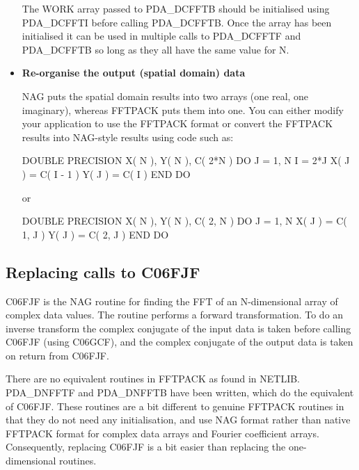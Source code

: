 \documentclass[11pt,twoside,nolof]{starlink}
\begin{document}
\begin{itemize}
   The WORK array passed to PDA\_DCFFTB should be initialised using
   PDA\_DCFFTI before calling PDA\_DCFFTB. Once the array has been
   initialised it can be used in multiple calls to PDA\_DCFFTF and
   PDA\_DCFFTB so long as they all have the same value for N.

\item\textbf{Re-organise the output (spatial domain) data}

   NAG puts the spatial domain results into two arrays (one real, one
   imaginary), whereas FFTPACK puts them into one. You can either
   modify your application to use the FFTPACK format or convert the
   FFTPACK results into NAG-style results using code such as:

\begin{terminalv}
      DOUBLE PRECISION X( N ), Y( N ), C( 2*N )
      DO J = 1, N
         I = 2*J
         X( J ) = C( I - 1 )
         Y( J ) = C( I )
      END DO
\end{terminalv}

   or

\begin{terminalv}
      DOUBLE PRECISION X( N ), Y( N ), C( 2, N )
      DO J = 1, N
         X( J ) = C( 1, J )
         Y( J ) = C( 2, J )
      END DO
\end{terminalv}

\end{itemize}


\subsection{\label{m_c06fjf}Replacing calls to C06FJF}

   C06FJF is the NAG routine for finding the FFT of an N-dimensional
   array of complex data values. The routine performs a forward
   transformation. To do an inverse transform the complex conjugate of
   the input data is taken before calling C06FJF (using C06GCF), and the
   complex conjugate of the output data is taken on return from C06FJF.

   There are no equivalent routines in FFTPACK as found in NETLIB.
   PDA\_DNFFTF and PDA\_DNFFTB have been written, which do the equivalent of
   C06FJF. These routines are a bit different to genuine FFTPACK
   routines in that they do not need any initialisation, and use NAG
   format rather than native FFTPACK format for complex data arrays and
   Fourier coefficient arrays. Consequently, replacing C06FJF is a bit
   easier than replacing the one-dimensional routines.
\end{document}
